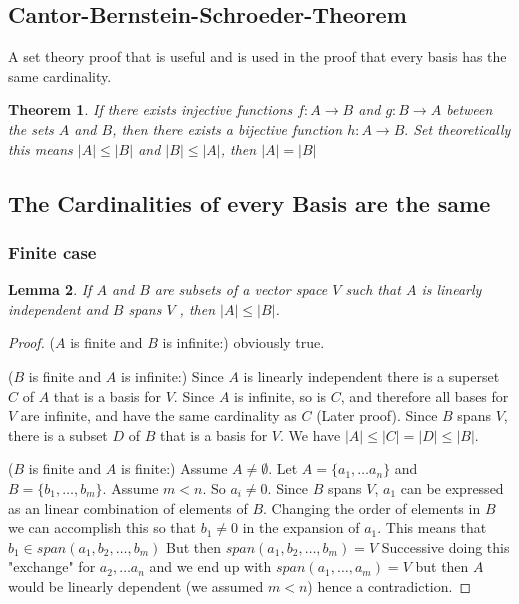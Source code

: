 \documentclass[titlepage]{article}
\newtheorem{thm}{Theorem}[section]
\newtheorem{lem}[thm]{Lemma}
\begin{document}
\subsection{Cantor-Bernstein-Schroeder-Theorem}
A set theory proof that is useful and is used in the proof that every basis has the same cardinality.

\begin{thm}
If there exists injective functions $f:A\rightarrow B$ and $g:B \rightarrow A$
between the sets $A$ and $B$, then there exists a bijective function $h: A \rightarrow B.$ Set theoretically this means $|A|\leq |B|$ and $|B| \leq |A|$, then $|A| = |B|$
\end{thm}
\subsection{The Cardinalities of every Basis are the same}
\subsubsection{Finite case}
\begin{lem}
\label{Cardi1}
If $A$ and $B$ are subsets of a vector space $V$ such that $A$ is linearly independent and $B$ spans $V$ , then $|A| \leq |B|$.
\end{lem}
\begin{proof}
($A$ is finite and $B$ is infinite:) obviously true.
 
($B$ is finite and $A$ is infinite:) Since $A$ is linearly independent there is a superset $C$ of $A$ that is a basis for $V$. Since $A$ is infinite, so is $C$, and therefore all bases for $V$ are infinite, and have the same cardinality as $C$ (Later proof). Since $B$ spans $V$, there is a subset $D$ of $B$ that is a basis for $V$. We have $|A| \leq |C| = |D| \leq |B|$. 

($B$ is finite and $A$ is finite:) Assume $A \neq \emptyset$. Let $A = \{a_1,\ldots a_n\}$ and $B = \{b_1,\ldots, b_m\}$. Assume  $m<n$. So $a_i \neq 0$. Since $B$ spans $V$, $a_1$ can be expressed as an linear combination of elements of $B$. Changing the order of elements in $B$ we can accomplish this so that $b_1 \neq 0$ in the expansion of $a_1$. This means that $b_1 \in span(a_1,b_2,\ldots , b_m)$ But then $span(a_1,b_2,\ldots , b_m) = V$
Successive  doing this "exchange" for $a_2,\ldots a_n$ and we end up with $span(a_1,\ldots,a_m) = V$ but then $A$ would be linearly dependent (we assumed $m<n$) hence a contradiction. 
\end{proof}
\end{document}

